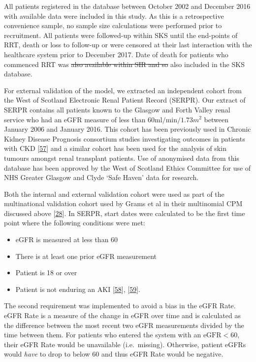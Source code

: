 \documentclass[
]{article}
\providecommand{\tightlist}{%
  \setlength{\itemsep}{0pt}\setlength{\parskip}{0pt}}
\begin{document}
All patients registered in the database between October 2002 and December 2016 with available data were included in this study. As this is a retrospective convenience sample, no sample size calculations were performed prior to recruitment. All patients were followed-up within SKS until the end-points of RRT, death or loss to follow-up or were censored at their last interaction with the healthcare system prior to December 2017. Date of death for patients who commenced RRT was \sout{also available within SIR and so} also included in the SKS database.

For external validation of the model, we extracted an independent cohort from the West of Scotland Electronic Renal Patient Record (SERPR). Our extract of SERPR contains all patients known to the Glasgow and Forth Valley renal service who had an eGFR measure of less than \(60\textrm{ml}/\textrm{min}/1.73m^2\) between January 2006 and January 2016. This cohort has been previously used in Chronic Kidney Disease Prognosis consortium studies investigating outcomes in patients with CKD {[}\protect\hyperlink{ref-matsushita_cohort_2013}{57}{]} and a similar cohort has been used for the analysis of skin tumours amongst renal transplant patients. Use of anonymised data from this database has been approved by the West of Scotland Ethics Committee for use of NHS Greater Glasgow and Clyde `Safe Haven' data for research.

Both the internal and external validation cohort were used as part of the multinational validation cohort used by Grams et al in their multinomial CPM discussed above {[}\protect\hyperlink{ref-grams_predicting_2018}{28}{]}. In SERPR, start dates were calculated to be the first time point where the following conditions were met:
\begin{itemize}
\tightlist
\item
  eGFR is measured at less than 60
\item
  There is at least one prior eGFR measurement
\item
  Patient is 18 or over
\item
  Patient is not enduring an AKI {[}\protect\hyperlink{ref-forni_renal_2017-1}{58}{]}, {[}\protect\hyperlink{ref-noauthor_kdigo_2012}{59}{]}.
\end{itemize}
The second requirement was implemented to avoid a bias in the eGFR Rate. eGFR Rate is a measure of the change in eGFR over time and is calculated as the difference between the most recent two eGFR measurements divided by the time between them. For patients who entered the system with an \(\textrm{eGFR} < 60\), their eGFR Rate would be unavailable (i.e.~missing). Otherwise, patient eGFRs would \emph{have} to drop to below 60 and thus eGFR Rate would be negative.
\end{document}
